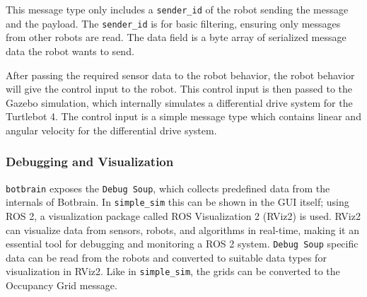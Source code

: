 This message type only includes a \texttt{sender\_id} of the robot sending the message and the payload. The \texttt{sender\_id} is for basic filtering, ensuring only messages from other robots are read.
The data field is a byte array of serialized message data the robot wants to send.

After passing the required sensor data to the robot behavior, the robot behavior will give the control input to the robot. This control input is then passed to the Gazebo simulation, which internally simulates a differential drive system for the Turtlebot 4. The control input is a simple message type which contains linear and angular velocity for the differential drive system.

\subsubsection{Debugging and Visualization}\label{sec:debugging_rviz}
\texttt{botbrain} exposes the \texttt{Debug Soup}, which collects predefined data from the internals of Botbrain.
In \texttt{simple\_sim} this can be shown in the GUI itself; using ROS 2, a visualization package called ROS Visualization 2 (RViz2) is used.
RViz2 can visualize data from sensors, robots, and algorithms in real-time, making it an essential tool for debugging and monitoring a ROS 2 system.
\texttt{Debug Soup} specific data can be read from the robots and converted to suitable data types for visualization in RViz2. Like in \texttt{simple\_sim}, the grids can be converted to the Occupancy Grid message.

